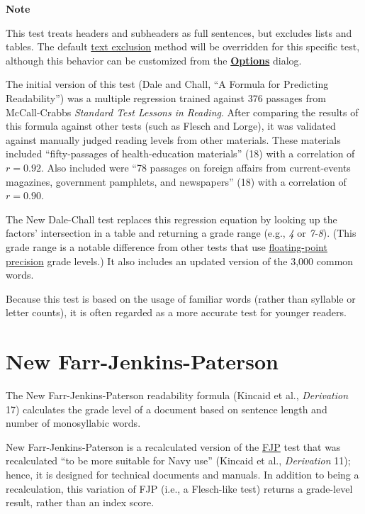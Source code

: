 \documentclass[
]{book}
\newenvironment{notesection}
    {
    \begin{tcolorbox}[colframe=mediumblue,colback=lightblue,coltext=mediumblue,arc=3mm]
    \faLightbulb[regular] \textbf{Note} \newline
    }
    {
    \end{tcolorbox}
    }
\theoremstyle{definition}
\theoremstyle{definition}
\theoremstyle{definition}
\theoremstyle{definition}
\theoremstyle{remark}
\begin{document}
\begin{notesection}
This test treats headers and subheaders as full sentences, but excludes lists and tables. The default \protect\hyperlink{options-text-exclusion}{text exclusion} method will be overridden for this specific test, although this behavior can be customized from the \protect\hyperlink{readability-test-options}{\textbf{Options}} dialog.

\end{notesection}

The initial version of this test (Dale and Chall, ``A Formula for Predicting Readability'') was a multiple regression trained against 376 passages from McCall-Crabbs \emph{Standard Test Lessons in Reading}. After comparing the results of this formula against other tests (such as Flesch and Lorge), it was validated against manually judged reading levels from other materials. These materials included ``fifty-passages of health-education materials'' (18) with a correlation of \(r = 0.92\). Also included were ``78 passages on foreign affairs from current-events magazines, government pamphlets, and newspapers'' (18) with a correlation of \(r = 0.90\).

The New Dale-Chall test replaces this regression equation by looking up the factors' intersection in a table and returning a grade range (e.g., \emph{4} or \emph{7-8}). (This grade range is a notable difference from other tests that use \protect\hyperlink{grade-level-results}{floating-point precision} grade levels.) It also includes an updated version of the 3,000 common words.

Because this test is based on the usage of familiar words (rather than syllable or letter counts), it is often regarded as a more accurate test for younger readers.


\newpage

\hypertarget{new-farr-jenkins-paterson}{%
\section{\texorpdfstring{New Farr-Jenkins-Paterson}{New Farr-Jenkins-Paterson}}\label{new-farr-jenkins-paterson}}

The New Farr-Jenkins-Paterson readability formula (Kincaid et al., \emph{Derivation} 17) calculates the grade level of a document based on sentence length and number of monosyllabic words.

New Farr-Jenkins-Paterson is a recalculated version of the \protect\hyperlink{farr-jenkins-paterson}{FJP} test that was recalculated ``to be more suitable for Navy use'' (Kincaid et al., \emph{Derivation} 11); hence, it is designed for technical documents and manuals. In addition to being a recalculation, this variation of FJP (i.e., a Flesch-like test) returns a grade-level result, rather than an index score.
\end{document}
